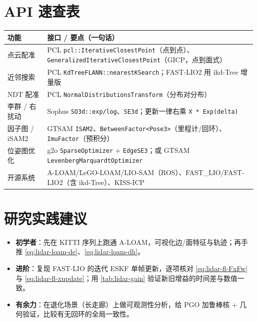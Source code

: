 \section*{API 速查表}
\begin{table}[H]\centering\small
\begin{tabular}{p{} p{}}
\toprule
功能 & 接口 / 要点（一句话） \\
\midrule
点云配准 & PCL \texttt{pcl::IterativeClosestPoint}（点到点）、\texttt{GeneralizedIterativeClosestPoint}（GICP，点到面式） \\
近邻搜索 & PCL \texttt{KdTreeFLANN::nearestKSearch}；FAST-LIO2 用 ikd-Tree 增量版 \\
NDT 配准 & PCL \texttt{NormalDistributionsTransform}（分布对分布） \\
李群 / 右扰动 & Sophus \texttt{SO3d::exp/\allowbreak log}、\texttt{SE3d}；更新一律右乘 \texttt{X * Exp(delta)} \\
因子图 / iSAM2 & GTSAM \texttt{ISAM2}、\texttt{BetweenFactor<Pose3>}（里程计/回环）、\texttt{ImuFactor}（预积分） \\
位姿图优化 & g2o \texttt{SparseOptimizer} + \texttt{EdgeSE3}；或 GTSAM \texttt{LevenbergMarquardtOptimizer} \\
开源系统 & A-LOAM/LeGO-LOAM/LIO-SAM（ROS）、FAST\_LIO/FAST-LIO2（含 ikd-Tree）、KISS-ICP \\
\bottomrule
\end{tabular}
\end{table}

\section*{研究实践建议}
\begin{itemize}
  \item \textbf{初学者}：先在 KITTI 序列上跑通 A-LOAM，可视化边/面特征与轨迹；再手推 \cref{eq:lidar-loam-de}、\cref{eq:lidar-loam-dh}。
  \item \textbf{进阶}：复现 FAST-LIO 的迭代 ESKF 单帧更新，逐项核对 \cref{eq:lidar-fl-FxFw} 与 \cref{eq:lidar-fl-xupdate}；用 \cref{tab:lidar-gain} 验证新旧增益的时间差与数值一致。
  \item \textbf{有余力}：在退化场景（长走廊）上做可观测性分析，给 PGO 加鲁棒核 + 几何验证，比较有无回环的全局一致性。
\end{itemize}
